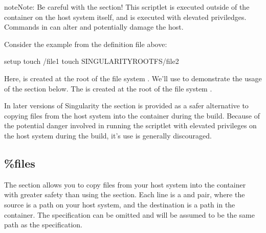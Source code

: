 \documentclass[letterpaper,10pt,english]{sphinxmanual}
\begin{document}
\begin{sphinxadmonition}{note}{Note:}
Be careful with the  section! This scriptlet is executed outside
of the container on the host system itself, and is executed with elevated
priviledges. Commands in  can alter and potentially damage the
host.
\end{sphinxadmonition}

Consider the example from the definition file above:

%
\begin{sphinxVerbatim}[commandchars=\\\{\}]
\PYGZpc{}setup
    touch /file1
    touch \PYGZdl{}\PYGZob{}SINGULARITY\PYGZus{}ROOTFS\PYGZcb{}/file2
\end{sphinxVerbatim}

Here,  is created at the root of the file system .
We’ll use  to demonstrate the usage of the  section below.
The  is created at the root of the file system .

In later versions of Singularity the  section is provided as a safer
alternative to copying files from the host system into the container during the
build. Because of the potential danger involved in running the 
scriptlet with elevated privileges on the host system during the build, it’s
use is generally discouraged.


\subsection{\%files}
\label{\detokenize{definition_files:files}}
The  section allows you to copy files from your host system into the
container with greater safety than using the  section. Each line is a
 and  pair, where the source is a path on your host
system, and the destination is a path in the container. The  
specification can be omitted and will be assumed to be the same path as the
 specification.
\end{document}
